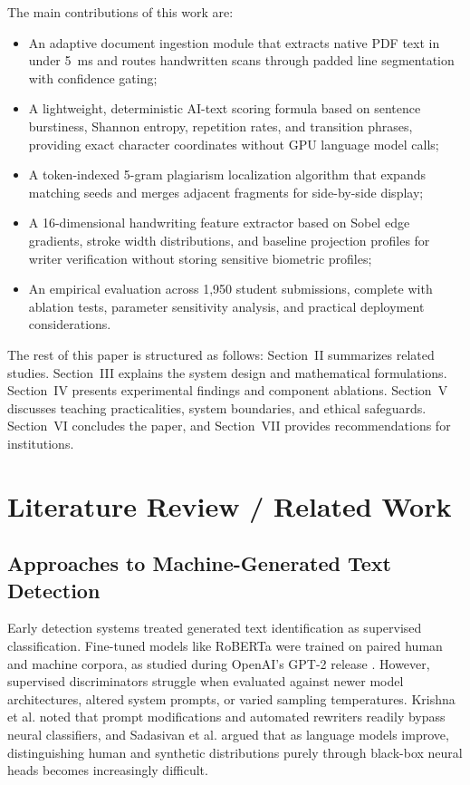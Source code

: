 \documentclass[conference]{IEEEtran}
\begin{document}
The main contributions of this work are:
\begin{itemize}
    \item An adaptive document ingestion module that extracts native PDF text in under 5~ms and routes handwritten scans through padded line segmentation with confidence gating;
    \item A lightweight, deterministic AI-text scoring formula based on sentence burstiness, Shannon entropy, repetition rates, and transition phrases, providing exact character coordinates without GPU language model calls;
    \item A token-indexed 5-gram plagiarism localization algorithm that expands matching seeds and merges adjacent fragments for side-by-side display;
    \item A 16-dimensional handwriting feature extractor based on Sobel edge gradients, stroke width distributions, and baseline projection profiles for writer verification without storing sensitive biometric profiles;
    \item An empirical evaluation across 1,950 student submissions, complete with ablation tests, parameter sensitivity analysis, and practical deployment considerations.
\end{itemize}

The rest of this paper is structured as follows: Section~II summarizes related studies. Section~III explains the system design and mathematical formulations. Section~IV presents experimental findings and component ablations. Section~V discusses teaching practicalities, system boundaries, and ethical safeguards. Section~VI concludes the paper, and Section~VII provides recommendations for institutions.

\section{Literature Review / Related Work}

\subsection{Approaches to Machine-Generated Text Detection}
Early detection systems treated generated text identification as supervised classification. Fine-tuned models like RoBERTa \cite{liu2019roberta} were trained on paired human and machine corpora, as studied during OpenAI's GPT-2 release \cite{solaiman2019release}. However, supervised discriminators struggle when evaluated against newer model architectures, altered system prompts, or varied sampling temperatures. Krishna et al. \cite{krishna2023paraphrasing} noted that prompt modifications and automated rewriters readily bypass neural classifiers, and Sadasivan et al. \cite{sadasivan2023can} argued that as language models improve, distinguishing human and synthetic distributions purely through black-box neural heads becomes increasingly difficult.
\end{document}
